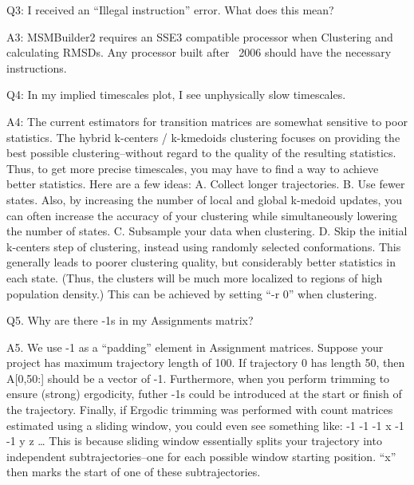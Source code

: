 \documentclass[12pt]{article}
\begin{document}
\vspace{5mm}

Q3: I received an “Illegal instruction” error.  What does this mean?

A3:  MSMBuilder2 requires an SSE3 compatible processor when Clustering and calculating RMSDs.  Any processor built after ~2006 should have the necessary instructions.  

\vspace{5mm}

Q4:  In my implied timescales plot, I see unphysically slow timescales.  

A4:  The current estimators for transition matrices are somewhat sensitive to poor statistics.  The hybrid k-centers / k-kmedoids clustering focuses on providing the best possible clustering--without regard to the quality of the resulting statistics.  Thus, to get more precise timescales, you may have to find a way to achieve better statistics.  Here are a few ideas:
	A.  Collect longer trajectories.
	B.  Use fewer states.  Also, by increasing the number of local and global k-medoid updates, you can often increase the accuracy of your clustering while simultaneously lowering the number of states.  
	C.  Subsample your data when clustering.
	D.  Skip the initial k-centers step of clustering, instead using randomly selected conformations.  This generally leads to poorer clustering quality, but considerably better statistics in each state.  (Thus, the clusters will be much more localized to regions of high population density.)  This can be achieved by setting “-r 0” when clustering.  

\vspace{5mm}

Q5.  Why are there -1s in my Assignments matrix?

A5.  We use -1 as a “padding” element in Assignment matrices. Suppose your project has maximum trajectory length of 100.  If trajectory 0 has length 50, then A[0,50:] should be a vector of -1.  Furthermore, when you perform trimming to ensure (strong) ergodicity, futher -1s could be introduced at the start or finish of the trajectory.  Finally, if Ergodic trimming was performed with count matrices estimated using a sliding window, you could even see something like:
-1 -1 -1 x -1 -1 y z …
This is because sliding window essentially splits your trajectory into independent subtrajectories--one for each possible window starting position.  “x” then marks the start of one of these subtrajectories.
\end{document}
